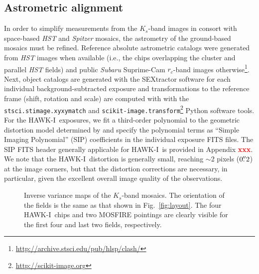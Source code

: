 \documentclass[preprint2]{aastex6}
\newcommand\xxx{{\textcolor{red}{\bf xxx}}}
\gdef\HAWKI{\mbox{HAWK-I}}
\begin{document}
\subsection{Astrometric alignment}
\label{s:astrometry}

In order to simplify measurements from the $K_s$-band images in consort with space-based \textit{HST} and \textit{Spitzer} mosaics, the astrometry of the ground-based mosaics must be refined.  Reference absolute astrometric catalogs were generated from \textit{HST} images when available (i.e., the chips overlapping the cluster and parallel \textit{HST} fields) and public \textit{Subaru} Suprime-Cam $r_c$-band images otherwise\footnote{\url{http://archive.stsci.edu/pub/hlsp/clash/}}.  Next, object catalogs are generated with the SEXtractor software \citep{bertin:96} for each individual background-subtracted exposure and transformations to the reference frame (shift, rotation and scale) are computed with with the \texttt{stsci.stimage.xyxymatch} and \texttt{scikit-image.transform}\footnote{\url{http://scikit-image.org}} Python software tools.  For the \HAWKI\ exposures, we fit a third-order polynomial to the geometric distortion model determined by \cite{libralato:14} and specify the polynomial terms as ``Simple Imaging Polynomial'' (SIP) coefficients \citep{fits:sip} in the individual exposure FITS files.  The SIP FITS header generally applicable for \HAWKI\ is provided in Appendix \xxx.  We note that the \HAWKI\ distortion is generally small, reaching $\sim$2 pixels ($0\mbox{$.\!\!^{\prime\prime}$}2$) at the image corners, but that the distortion corrections are necessary, in particular, given the excellent overall image quality of the observations. 

\begin{figure}[!ht]
\caption{Inverse variance maps of the $K_s$-band mosaics.  The orientation of the fields is the same as that shown in Fig.~\ref{fig:layout}.  The four \HAWKI\ chips and two MOSFIRE pointings are clearly visible for the first four and last two fields, respectively.
\label{fig:ivar_mosaics}}  
\end{figure}

\end{document}
